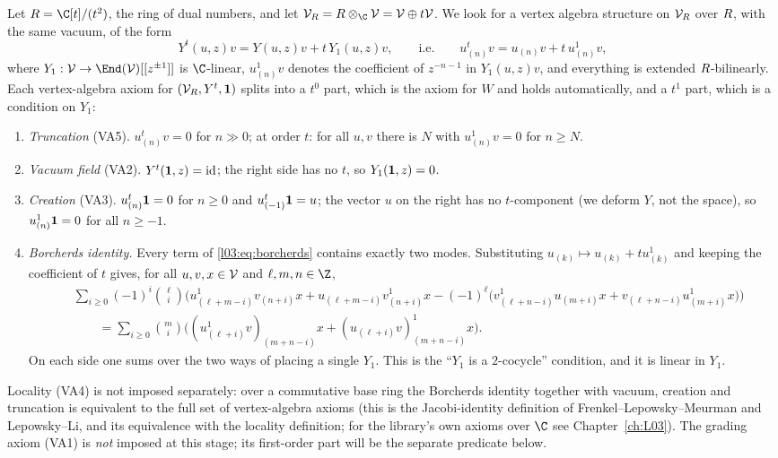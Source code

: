 Let $\lsevenR = \C[t]/(t^2)$, the ring of dual numbers, and let $\lsevenV_\lsevenR = \lsevenR\otimes_\C
\lsevenV = \lsevenV\oplus t\lsevenV$. We look for a vertex algebra structure on $\mathcal{V}_R$ over
$R$, with the same vacuum, of the form
\begin{equation}\label{l07:eq:Yt}
 Y^t(u,z)v = Y(u,z)v + t\,Y_1(u,z)v,\qquad\text{i.e.}\qquad u^t_{(n)}v = u_{(n)}v + t\,u^1_{(n)}v,
\end{equation}
where $Y_1 : \lsevenV\to\End(\lsevenV)[[z^{\pm1}]]$ is $\C$-linear, $u^1_{(n)}v$ denotes the coefficient
of $z^{-n-1}$ in $Y_1(u,z)v$, and everything is extended $R$-bilinearly. Each vertex-algebra
axiom for $(\mathcal{V}_R, Y^t,\mathbf{1})$ splits into a $t^0$ part, which is the axiom for $W$ and
holds automatically, and a $t^1$ part, which is a condition on $Y_1$:
\begin{enumerate}[label=(D\arabic*)]
\item \emph{Truncation} (VA5). $u^t_{(n)}v = 0$ for $n\gg0$; at order $t$: for all $u,v$ there is
  $N$ with $u^1_{(n)}v = 0$ for $n\ge N$.
\item \emph{Vacuum field} (VA2). $Y^t(\mathbf{1},z) = \mathrm{id}$; the right side has no $t$, so
  $Y_1(\mathbf{1},z) = 0$.
\item \emph{Creation} (VA3). $u^t_{(n)}\mathbf{1} = 0$ for $n\ge0$ and $u^t_{(-1)}\mathbf{1} = u$; the
  vector $u$ on the right has no $t$-component (we deform $Y$, not the space), so
  $u^1_{(n)}\mathbf{1} = 0$ for all $n\ge-1$.
\item \emph{Borcherds identity.} Every term of \eqref{l03:eq:borcherds} contains exactly two
  modes. Substituting $u_{(k)}\mapsto u_{(k)} + tu^1_{(k)}$ and keeping the coefficient of $t$
  gives, for all $u,v,x\in\mathcal{V}$ and $\ell,m,n\in\Z$,
  \begin{equation}\label{l07:eq:jac1}
  \begin{aligned}
   &\sum_{i\ge0}(-1)^i\binom{\ell}{i}\Big(u^1_{(\ell+m-i)}v_{(n+i)}x + u_{(\ell+m-i)}v^1_{(n+i)}x
     - (-1)^\ell\big(v^1_{(\ell+n-i)}u_{(m+i)}x + v_{(\ell+n-i)}u^1_{(m+i)}x\big)\Big)\\
   &\qquad = \sum_{i\ge0}\binom mi\Big((u^1_{(\ell+i)}v)_{(m+n-i)}x + (u_{(\ell+i)}v)^1_{(m+n-i)}x\Big).
  \end{aligned}
  \end{equation}
  On each side one sums over the two ways of placing a single $Y_1$. This is the ``$Y_1$ is a
  $2$-cocycle'' condition, and it is linear in $Y_1$.
\end{enumerate}
Locality (VA4) is not imposed separately: over a commutative base ring the Borcherds identity
together with vacuum, creation and truncation is equivalent to the full set of vertex-algebra
axioms (this is the Jacobi-identity definition of Frenkel--Lepowsky--Meurman and Lepowsky--Li, and
its equivalence with the locality definition; for the library's own axioms over $\C$ see
Chapter~\ref{ch:L03}). The grading axiom (VA1) is \emph{not} imposed at this stage; its first-order
part will be the separate predicate  below.

